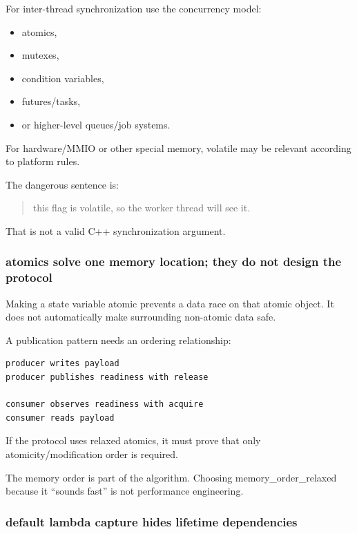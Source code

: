 For inter-thread synchronization use the concurrency model:

\begin{itemize}
\tightlist
\item
  atomics,
\item
  mutexes,
\item
  condition variables,
\item
  futures/tasks,
\item
  or higher-level queues/job systems.
\end{itemize}

For hardware/MMIO or other special memory, volatile may be relevant according to platform rules.

The dangerous sentence is:

\begin{quote}
this flag is volatile, so the worker thread will see it.
\end{quote}

That is not a valid C++ synchronization argument.

\subsubsection{atomics solve one memory location; they do not design the protocol}\label{01-foundations-i-ch005-atomics-solve-one-memory-location-they-do-not-design-the-protocol}

Making a state variable atomic prevents a data race on that atomic object. It does not automatically make surrounding non-atomic data safe.

A publication pattern needs an ordering relationship:

\begin{verbatim}
producer writes payload
producer publishes readiness with release

consumer observes readiness with acquire
consumer reads payload
\end{verbatim}

If the protocol uses relaxed atomics, it must prove that only atomicity/modification order is required.

The memory order is part of the algorithm. Choosing memory\_order\_relaxed because it ``sounds fast'' is not performance engineering.

\subsubsection{default lambda capture hides lifetime dependencies}\label{01-foundations-i-ch005-default-lambda-capture-hides-lifetime-dependencies}

